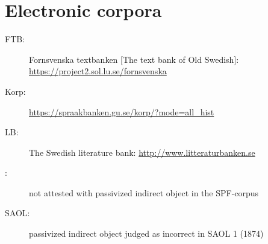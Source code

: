 \documentclass[output=paper]{langscibook}
\begin{document}
\section*{Electronic corpora}

\begin{description}
\item[FTB:] Fornsvenska textbanken [The text bank of Old Swedish]: \url{https://project2.sol.lu.se/fornsvenska} 
\item[Korp:] \url{https://spraakbanken.gu.se/korp/?mode=all_hist}
\item[LB:] The Swedish literature bank: \url{http://www.litteraturbanken.se}
\end{description}



\label{falk:appendix:1}

\begin{description}
\item[\normalfont *:] not attested with passivized indirect object in the SPF-corpus
\item[\normalfont SAOL:] passivized indirect object judged as incorrect in SAOL 1 (1874)
\end{description}
\end{document}

